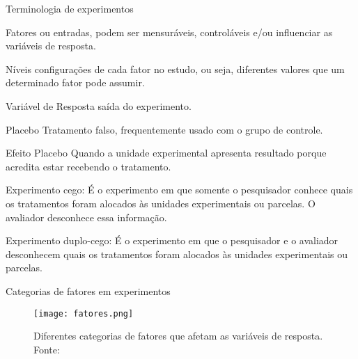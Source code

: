 \documentclass[aspectratio=43,10pt]{beamer}
\begin{document}
\begin{frame}[allowframebreaks]{Terminologia de experimentos}
    \begin{exampleblock}{Fatores}
        ou entradas, podem ser mensuráveis, controláveis e/ou influenciar as variáveis de resposta.
    \end{exampleblock}
    \begin{exampleblock}{Níveis}
        configurações de cada fator no estudo, ou seja, diferentes
        valores que um determinado fator pode assumir.
    \end{exampleblock}
    \begin{exampleblock}{Variável de Resposta}
        saída do experimento.
    \end{exampleblock}
    \begin{exampleblock}{Placebo}
        Tratamento falso, frequentemente usado com o grupo de controle.
    \end{exampleblock}
    \begin{exampleblock}{Efeito Placebo}
        Quando a unidade experimental apresenta resultado porque acredita estar recebendo 
        o tratamento.
    \end{exampleblock}
    \begin{exampleblock}{Experimento cego:}
        É o experimento em que somente o pesquisador conhece quais 
        os tratamentos foram alocados às unidades experimentais
        ou parcelas. O avaliador desconhece essa informação.
    \end{exampleblock}
    \begin{exampleblock}{Experimento duplo-cego:}
        É o experimento em que o pesquisador e o avaliador desconhecem quais
        os tratamentos foram alocados às unidades experimentais ou parcelas.
    \end{exampleblock}
\end{frame}

\begin{frame}{Categorias de fatores em experimentos}
    \begin{figure}
      \centering
      \texttt{[image: fatores.png]}
      \caption{Diferentes categorias de fatores que afetam as variáveis de resposta. Fonte: }
    \end{figure}
\end{frame}
\end{document}
